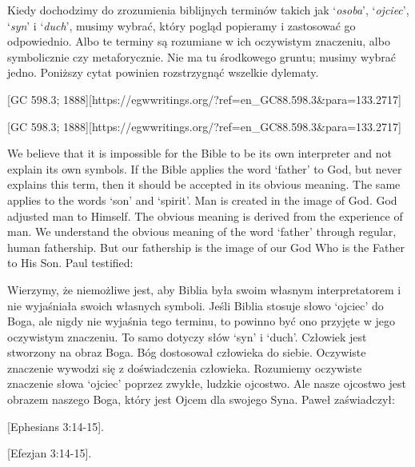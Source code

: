 Kiedy dochodzimy do zrozumienia biblijnych terminów takich jak ‘\textit{osoba}’, ‘\textit{ojciec}’, ‘\textit{syn}’ i ‘\textit{duch}’, musimy wybrać, który pogląd popieramy i zastosować go odpowiednio. Albo te terminy są rozumiane w ich oczywistym znaczeniu, albo symbolicznie czy metaforycznie. Nie ma tu środkowego gruntu; musimy wybrać jedno. Poniższy cytat powinien rozstrzygnąć wszelkie dylematy.


[GC 598.3; 1888][https://egwwritings.org/?ref=en\_GC88.598.3&para=133.2717]


[GC 598.3; 1888][https://egwwritings.org/?ref=en\_GC88.598.3&para=133.2717]


We believe that it is impossible for the Bible to be its own interpreter and not explain its own symbols. If the Bible applies the word ‘father’ to God, but never explains this term, then it should be accepted in its obvious meaning. The same applies to the words ‘son’ and ‘spirit’. Man is created in the image of God. God adjusted man to Himself. The obvious meaning is derived from the experience of man. We understand the obvious meaning of the word ‘father’ through regular, human fathership. But our fathership is the image of our God Who is the Father to His Son. Paul testified:


Wierzymy, że niemożliwe jest, aby Biblia była swoim własnym interpretatorem i nie wyjaśniała swoich własnych symboli. Jeśli Biblia stosuje słowo ‘ojciec’ do Boga, ale nigdy nie wyjaśnia tego terminu, to powinno być ono przyjęte w jego oczywistym znaczeniu. To samo dotyczy słów ‘syn’ i ‘duch’. Człowiek jest stworzony na obraz Boga. Bóg dostosował człowieka do siebie. Oczywiste znaczenie wywodzi się z doświadczenia człowieka. Rozumiemy oczywiste znaczenie słowa ‘ojciec’ poprzez zwykłe, ludzkie ojcostwo. Ale nasze ojcostwo jest obrazem naszego Boga, który jest Ojcem dla swojego Syna. Paweł zaświadczył:


[Ephesians 3:14-15].


[Efezjan 3:14-15].


